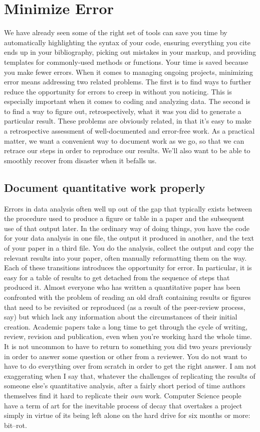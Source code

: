 \documentclass[11pt,article,oneside]{memoir}
\begin{document}
\section{Minimize Error}  
We have already seen some of the right set of tools can save you time by automatically highlighting the syntax of your code, ensuring everything you cite ends up in your bibliography, picking out mistakes in your markup, and providing templates for commonly-used methods or functions. Your time is saved because you make fewer errors. When it comes to managing ongoing projects, minimizing error means addressing two related problems. The first is to find ways to further reduce the opportunity for errors to creep in without you noticing. This is especially important when it comes to coding and analyzing data. The second is to find a way to figure out, retrospectively, what it was you did to generate a particular result. These problems are obviously related, in that it's easy to make a retrospective assessment of  well-documented and error-free work. As a practical matter, we want a convenient way to document work as we go, so that we can retrace our steps in order to reproduce our results. We'll also want to be able to smoothly recover from disaster when it befalls us.

\subsection{Document quantitative work properly} 
Errors in data analysis often well up out of the gap that typically exists between the procedure used to produce a figure or table in a paper and the subsequent use of that output later. In the ordinary way of doing things, you have the code for your data analysis in one file, the output it produced in another, and the text of your paper in a third file. You do the analysis, collect the output and copy the relevant results into your paper, often manually reformatting them on the way. Each of these transitions introduces the opportunity for error. In particular, it is easy for a table of results to get detached from the sequence of steps that produced it. Almost everyone who has written a quantitative paper has been confronted with the problem of reading an old draft containing results or figures that need to be revisited or reproduced (as a result of the peer-review process, say) but which lack any information about the circumstances of their initial creation. Academic papers take a long time to get through the cycle of writing, review, revision and publication, even when you're working hard the whole time. It is not uncommon to have to return to something you did two years previously in order to answer some question or other from a reviewer. You do not want to have to do everything over from scratch in order to get the right answer. I am not exaggerating when I say that, whatever the challenges of replicating the results of someone else's quantitative analysis, after a fairly short period of time authors themselves find it hard to replicate their \emph{own} work. Computer Science people have a term of art for the inevitable process of decay that overtakes a project simply in virtue of its being left alone on the hard drive for six months or more: bit--rot.
\end{document}
